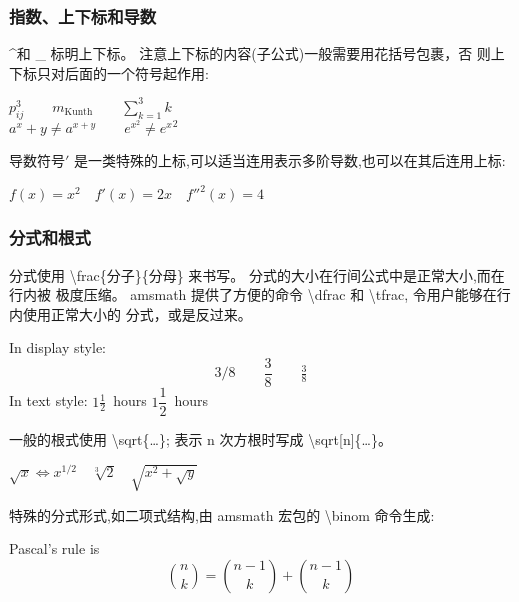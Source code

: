 \documentclass[a4paper]{ctexart}
\begin{document}
    \subsubsection{指数、上下标和导数}
    \textasciicircum 和 \_ 标明上下标。%
    注意上下标的内容(子公式)一般需要用花括号包裹，否 则上下标只对后面的一个符号起作用:\par
    $p^3_{ij} \qquad
     m_\mathrm{Kunth} \qquad
     \sum_{k=1}^3 k$\\
    $a^x +y \neq a^{x+y} \qquad
     e^{x^2} \neq {e^x}^2$ \par
    导数符号$'$ 是一类特殊的上标,可以适当连用表示多阶导数,也可以在其后连用上标:\par
    $f(x) = x^2 \quad
     f'(x) = 2x \quad
     f''^{2}(x) = 4$ \par
    \subsubsection{分式和根式}
    分式使用 \textbackslash frac\{分子\}\{分母\} 来书写。%
    分式的大小在行间公式中是正常大小,而在行内被 极度压缩。%
    amsmath 提供了方便的命令 \textbackslash dfrac 和 \textbackslash tfrac,%
    令用户能够在行内使用正常大小的 分式，或是反过来。\par
    In display style:
    \[
        3/8 \qquad
        \frac{3}{8} \qquad
        \tfrac{3}{8}
    \]
    In text style:
    $1\frac{1}{2}$~hours \qquad
    $1\dfrac{1}{2}$~hours\par
    一般的根式使用 \textbackslash sqrt\{\dots\};%
    表示 n 次方根时写成 \textbackslash sqrt[n]\{\dots\}。\par
    $\sqrt{x} \Leftrightarrow x^{1/2} \quad
     \sqrt[3]{2} \quad
     \sqrt{x^{2} + \sqrt{y}}$ \par
    特殊的分式形式,如二项式结构,由 amsmath 宏包的 \textbackslash binom 命令生成:\par
    Pascal's rule is
    \[
        \binom{n}{k} = \binom{n - 1}{k} + \binom{n - 1}{k}   
    \]
    \newpage
\end{document}

